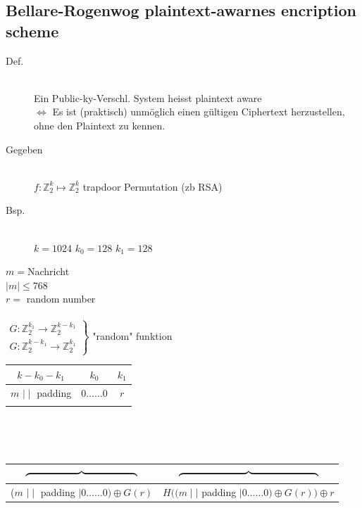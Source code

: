 \documentclass[10pt]{article}
\newcommand{\ZN}{\mathbb{Z}} %
\newcommand{\Brackar}[2]{\left.\begin{array}{#1} #2 \end{array}\right\rbrace} %
\begin{document}
\subsection{Bellare-Rogenwog plaintext-awarnes encription scheme}
\begin{description}
	\item[Def.] \hfill \\
		Ein Public-ky-Verschl. System heisst {\color{red} plaintext aware} \\
		$\Longleftrightarrow$ Es ist (praktisch) unmöglich einen {\color{red}gültigen} Ciphertext herzustellen, ohne den Plaintext zu kennen.
	\item[Gegeben] \hfill \\
		$f: \ZN^k_2 \longmapsto \ZN^k_2$ trapdoor Permutation (zb RSA) 
	\item[Bsp.] \hfill \\
		$k=1024$ $k_0=128$ $k_1=128$
\end{description}
$m=$Nachricht \\ 
$|m|\leq768$ \\ 
{\color{red} $r=$ random number} \\ \\
$\Brackar{l}{G: \ZN^{k_1}_2 \longrightarrow \ZN^{k-k_1}_2 \\ G: \ZN^{k-k_1}_2 \longrightarrow \ZN^{k_1}_2}$ "random" funktion
\begin{center}
\begin{tabular}{|c|c|c|}
\multicolumn{1}{c}{$k-k_0-k_1$}&\multicolumn{1}{c}{$k_0$}&\multicolumn{1}{c}{$k_1$}\\\hline
$m$ $\mid\mid$ padding & $0\dots\dots0$&{\color{red}$r$}\\\hline
\multicolumn{2}{c}{\raisebox{.5\normalbaselineskip}{$\underbrace{\hspace*{4cm}}$}}&\multicolumn{1}{c}{\raisebox{.5\normalbaselineskip}{$\underbrace{\hspace*{3cm}}$}}
\end{tabular}\\
 \\
\begin{tabular}{|c|c|}
\multicolumn{1}{c}{$\overbrace{\hspace*{4cm}}$}&\multicolumn{1}{c}{$\overbrace{\hspace*{5cm}}$}\\\hline
($m$ $\mid\mid$ padding $\mid 0\dots\dots0)\oplus G(r)$&$H((m\mid\mid$ padding $\mid 0\dots\dots0)\oplus G(r))\oplus r$\\\hline
\end{tabular}\\
\end{center}
\end{document}
